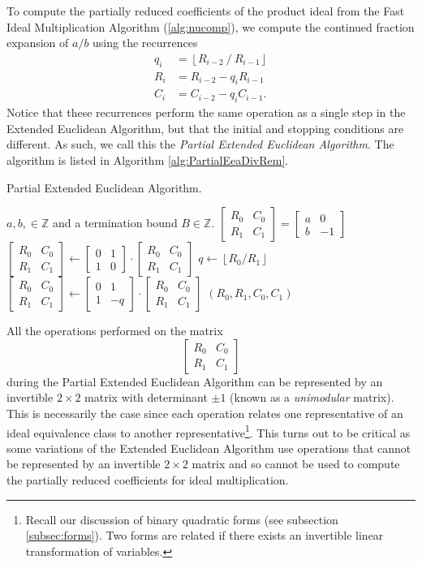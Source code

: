 \documentclass{ucalgthes1}
\theoremstyle{definition}
\newcommand{\ZZ}{\mathbb{Z}}
\newcommand{\matrixtt}[4]{\left[ \begin{array}{rr} #1 & #2 \\ #3 & #4 \end{array} \right]}
\newcommand{\floor}[1]{\left\lfloor #1 \right\rfloor}
\begin{document}
To compute the partially reduced coefficients of the product ideal from the Fast Ideal Multiplication Algorithm (\ref{alg:nucomp}), we compute the continued fraction expansion of $a/b$ using the recurrences
\begin{align*}
	q_i &= \floor{R_{i-2} ~/~ R_{i-1}} \\
	R_i &= R_{i-2} - q_i R_{i-1} \\
	C_i &= C_{i-2} - q_i C_{i-1}.
\end{align*}
Notice that these recurrences perform the same operation as a single step in the Extended Euclidean Algorithm, but that the initial and stopping conditions are different.  As such, we call this the \emph{Partial Extended Euclidean Algorithm}.    The algorithm is listed in Algorithm \ref{alg:PartialEeaDivRem}.

\begin{algorithm}[h]
\caption{Partial Extended Euclidean Algorithm.}
\label{alg:PartialEeaDivRem}
\begin{algorithmic}[1]
\REQUIRE $a,b, \in \ZZ$ and a termination bound $B \in \ZZ$.
\STATE $\matrixtt{R_0}{C_0}{R_1}{C_1} = \matrixtt{a}{0}{b}{-1}$
	\STATE $\matrixtt{R_0}{C_0}{R_1}{C_1} \gets
	        \matrixtt{0}{1}{1}{0} \cdot \matrixtt{R_0}{C_0}{R_1}{C_1}$
\ENDIF
{}
	\STATE $q \gets \floor{R_0 / R_1}$
	\STATE $\matrixtt{R_0}{C_0}{R_1}{C_1} \gets \matrixtt{0}{1}{1}{-q} \cdot
		    \matrixtt{R_0}{C_0}{R_1}{C_1}$ 
\ENDWHILE
\RETURN $(R_0, R_1, C_0, C_1)$
\end{algorithmic}
\end{algorithm}

All the operations performed on the matrix
\[
\matrixtt{R_0}{C_0}{R_1}{C_1}
\]
during the Partial Extended Euclidean Algorithm can be represented by an invertible $2 \times 2$ matrix with determinant $\pm 1$ (known as a \emph{unimodular} matrix).  This is necessarily the case since each operation relates one representative of an ideal equivalence class to another representative\footnote{Recall our discussion of binary quadratic forms (see subsection \ref{subsec:forms}). Two forms are related if there exists an invertible linear transformation of variables.}. This turns out to be critical as some variations of the Extended Euclidean Algorithm use operations that cannot be represented by an invertible $2 \times 2$ matrix and so cannot be used to compute the partially reduced coefficients for ideal multiplication.
\end{document}
